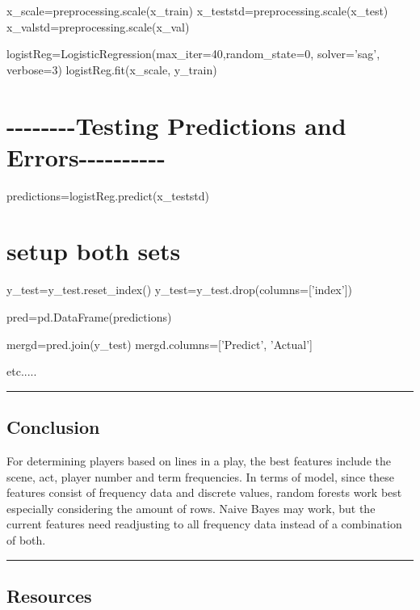 \documentclass[11pt]{article}
\begin{document}
x\_scale=preprocessing.scale(x\_train)
x\_teststd=preprocessing.scale(x\_test)
x\_valstd=preprocessing.scale(x\_val)

logistReg=LogisticRegression(max\_iter=40,random\_state=0, solver='sag',
verbose=3) logistReg.fit(x\_scale, y\_train)

\section{-\/-\/-\/-\/-\/-\/-\/-Testing Predictions and
Errors-\/-\/-\/-\/-\/-\/-\/-\/-\/-}\label{testing-predictions-and-errors----------}

predictions=logistReg.predict(x\_teststd)

\section{setup both sets}\label{setup-both-sets}

y\_test=y\_test.reset\_index()
y\_test=y\_test.drop(columns={[}'index'{]})

pred=pd.DataFrame(predictions)

mergd=pred.join(y\_test) mergd.columns={[}'Predict', 'Actual'{]}

etc.....

\begin{center}\rule{0.5\linewidth}{\linethickness}\end{center}

\subsection{Conclusion}\label{conclusion}

For determining players based on lines in a play, the best features
include the scene, act, player number and term frequencies. In terms of
model, since these features consist of frequency data and discrete
values, random forests work best especially considering the amount of
rows. Naive Bayes may work, but the current features need readjusting to
all frequency data instead of a combination of both.

    \begin{center}\rule{0.5\linewidth}{\linethickness}\end{center}

\subsection{Resources}\label{resources}
\end{document}
